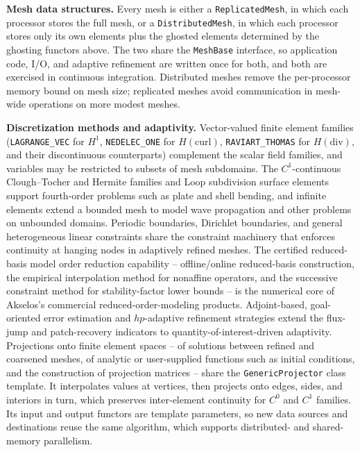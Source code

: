 \documentclass[preprint,12pt, a4paper]{elsarticle}
\begin{document}
\begin{enumerate}
\begin{enumerate}
\textbf{Mesh data structures.} Every mesh is either a \texttt{ReplicatedMesh}, in which each
processor stores the full mesh, or a \texttt{DistributedMesh}, in which each processor stores
only its own elements plus the ghosted elements determined by the ghosting functors above. The two
share the \texttt{MeshBase} interface, so application code, I/O, and adaptive refinement are
written once for both, and both are exercised in continuous integration. Distributed meshes
remove the per-processor memory bound on mesh size; replicated meshes avoid communication in
mesh-wide operations on more modest meshes.

\textbf{Discretization methods and adaptivity.} Vector-valued finite element families
(\texttt{LAGRANGE\_VEC} for $H^1$, \texttt{NEDELEC\_ONE} for $H(\mathrm{curl})$, \texttt{RAVIART\_THOMAS} for
$H(\mathrm{div})$, and their discontinuous counterparts) complement the scalar field families, and
variables may be restricted to subsets of mesh subdomains. The $C^1$-continuous Clough--Tocher
and Hermite families and Loop subdivision surface elements support fourth-order problems such as
plate and shell bending, and infinite elements extend a bounded mesh to model wave propagation
and other problems on unbounded domains. Periodic boundaries, Dirichlet
boundaries, and general heterogeneous linear constraints share the constraint machinery that
enforces continuity at hanging nodes in adaptively refined meshes. The certified reduced-basis model order reduction capability -- offline/online
reduced-basis construction, the empirical interpolation method for nonaffine operators, and the
successive constraint method for stability-factor lower bounds -- is the numerical core of
Akselos's commercial reduced-order-modeling products. Adjoint-based, goal-oriented error
estimation and $hp$-adaptive refinement strategies extend the flux-jump and patch-recovery
indicators to quantity-of-interest-driven adaptivity. Projections onto finite element
spaces -- of solutions between refined and coarsened meshes, of analytic or user-supplied
functions such as initial conditions, and the construction of projection matrices -- share the
\texttt{GenericProjector} class template. It interpolates values at vertices, then projects onto
edges, sides, and interiors in turn, which preserves inter-element continuity for $C^0$ and $C^1$
families. Its input and output functors are template
parameters, so new data sources and destinations reuse the same algorithm, which supports distributed- and
shared-memory parallelism.


\end{enumerate}
\end{enumerate}
\end{document}
